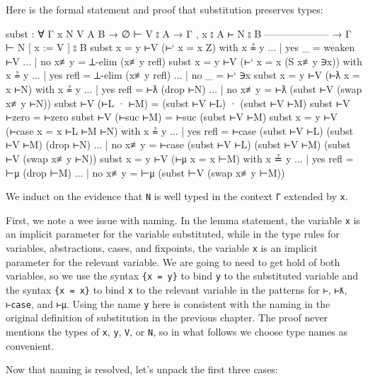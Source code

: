 Here is the formal statement and proof that substitution preserves
types:

\begin{fence}
\begin{code}
subst : ∀ {Γ x N V A B}
  → ∅ ⊢ V ⦂ A
  → Γ , x ⦂ A ⊢ N ⦂ B
    --------------------
  → Γ ⊢ N [ x := V ] ⦂ B
subst {x = y} ⊢V (⊢` {x = x} Z) with x ≟ y
... | yes _           =  weaken ⊢V
... | no  x≢y         =  ⊥-elim (x≢y refl)
subst {x = y} ⊢V (⊢` {x = x} (S x≢y ∋x)) with x ≟ y
... | yes refl        =  ⊥-elim (x≢y refl)
... | no  _           =  ⊢` ∋x
subst {x = y} ⊢V (⊢ƛ {x = x} ⊢N) with x ≟ y
... | yes refl        =  ⊢ƛ (drop ⊢N)
... | no  x≢y         =  ⊢ƛ (subst ⊢V (swap x≢y ⊢N))
subst ⊢V (⊢L · ⊢M)    =  (subst ⊢V ⊢L) · (subst ⊢V ⊢M)
subst ⊢V ⊢zero        =  ⊢zero
subst ⊢V (⊢suc ⊢M)    =  ⊢suc (subst ⊢V ⊢M)
subst {x = y} ⊢V (⊢case {x = x} ⊢L ⊢M ⊢N) with x ≟ y
... | yes refl        =  ⊢case (subst ⊢V ⊢L) (subst ⊢V ⊢M) (drop ⊢N)
... | no  x≢y         =  ⊢case (subst ⊢V ⊢L) (subst ⊢V ⊢M) (subst ⊢V (swap x≢y ⊢N))
subst {x = y} ⊢V (⊢μ {x = x} ⊢M) with x ≟ y
... | yes refl        =  ⊢μ (drop ⊢M)
... | no  x≢y         =  ⊢μ (subst ⊢V (swap x≢y ⊢M))
\end{code}
\end{fence}

We induct on the evidence that \texttt{N} is well typed in the context
\texttt{Γ} extended by \texttt{x}.

First, we note a wee issue with naming. In the lemma statement, the
variable \texttt{x} is an implicit parameter for the variable
substituted, while in the type rules for variables, abstractions, cases,
and fixpoints, the variable \texttt{x} is an implicit parameter for the
relevant variable. We are going to need to get hold of both variables,
so we use the syntax \texttt{\{x\ =\ y\}} to bind \texttt{y} to the
substituted variable and the syntax \texttt{\{x\ =\ x\}} to bind
\texttt{x} to the relevant variable in the patterns for
\texttt{⊢\textasciigrave{}}, \texttt{⊢ƛ}, \texttt{⊢case}, and
\texttt{⊢μ}. Using the name \texttt{y} here is consistent with the
naming in the original definition of substitution in the previous
chapter. The proof never mentions the types of \texttt{x}, \texttt{y},
\texttt{V}, or \texttt{N}, so in what follows we choose type names as
convenient.

Now that naming is resolved, let's unpack the first three cases:

